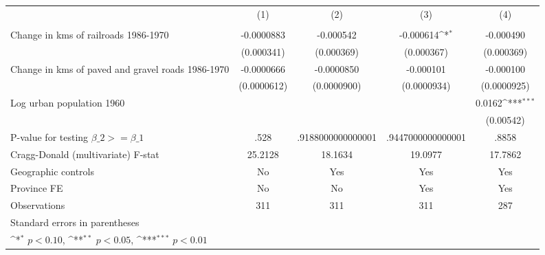 {
\def\sym#1{\ifmmode^{#1}\else\(^{#1}\)\fi}
\begin{tabular}{l*{4}{c}}
\hline\hline
                &\multicolumn{1}{c}{(1)}&\multicolumn{1}{c}{(2)}&\multicolumn{1}{c}{(3)}&\multicolumn{1}{c}{(4)}\\
                &\multicolumn{1}{c}{}&\multicolumn{1}{c}{}&\multicolumn{1}{c}{}&\multicolumn{1}{c}{}\\
\hline
Change in kms of railroads 1986-1970&-0.0000883         &-0.000542         &-0.000614\sym{*}  &-0.000490         \\
                &(0.000341)         &(0.000369)         &(0.000367)         &(0.000369)         \\
[1em]
Change in kms of paved and gravel roads 1986-1970&-0.0000666         &-0.0000850         &-0.000101         &-0.000100         \\
                &(0.0000612)         &(0.0000900)         &(0.0000934)         &(0.0000925)         \\
[1em]
Log urban population 1960&                  &                  &                  &   0.0162\sym{***}\\
                &                  &                  &                  &(0.00542)         \\
\hline
P-value for testing $\beta\_{2} >= \beta\_{1}$&     .528         &.9188000000000001         &.9447000000000001         &    .8858         \\
Cragg-Donald (multivariate) F-stat&  25.2128         &  18.1634         &  19.0977         &  17.7862         \\
Geographic controls&       No         &      Yes         &      Yes         &      Yes         \\
Province FE     &       No         &       No         &      Yes         &      Yes         \\
Observations    &      311         &      311         &      311         &      287         \\
\hline\hline
\multicolumn{5}{l}{\footnotesize Standard errors in parentheses}\\
\multicolumn{5}{l}{\footnotesize \sym{*} \(p<0.10\), \sym{**} \(p<0.05\), \sym{***} \(p<0.01\)}\\
\end{tabular}
}

